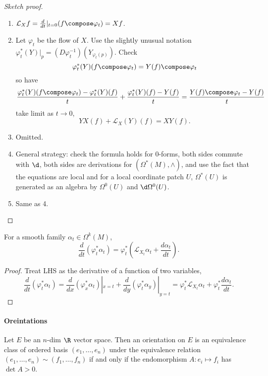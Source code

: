 \documentclass[a4paper]{article}
\newcommand{\w}{\wedge} %
\begin{document}
\begin{proof}[Sketch proof]\leavevmode
  \begin{enumerate}
  \item \(\mathcal L_X f = \frac{d}{dt}|_{t = 0} (f \compose \varphi_t) = Xf\).
  \item Let \(\varphi_t\) be the flow of \(X\). Use the slightly unusual notation \(\varphi_t^*(Y)|_p = (D\varphi_t^{-1})(Y_{\varphi_t(p)})\). Check
    \[
      \varphi_t^*(Y)(f \compose \varphi_t) = Y(f) \compose \varphi_t
    \]
    so have
    \[
      \frac{\varphi_t^*(Y)(f \compose \varphi_t) - \varphi_t^*(Y)(f)}{t} + \frac{\varphi_t^*(Y)(f) - Y(f)}{t} = \frac{Y(f) \compose \varphi_t - Y(f)}{t}
    \]
    take limit as \(t \to 0\),
    \[
      YX(f) + \mathcal L_X(Y)(f) = XY(f).
    \]
  \item Omitted.
  \item General strategy: check the formula holds for \(0\)-forms, both sides commute with \(\d\), both sides are derivations for \((\Omega^*(M), \w)\), and use the fact that the equations are local and for a local coordinate patch \(U\), \(\Omega^*(U)\) is generated as an algebra by \(\Omega^0(U)\) and \(\d \Omega^0(U)\).
  \item Same as 4.
  \end{enumerate}
\end{proof}

\begin{lemma}
  For a smooth family \(\alpha_t \in \Omega^k(M)\),
  \[
    \frac{d}{dt}(\varphi_t^* \alpha_t) = \varphi_t^*(\mathcal L_{X_t} \alpha_t + \frac{d \alpha_t}{dt}).
  \]
\end{lemma}

\begin{proof}
  Treat LHS as the derivative of a function of two variables,
  \[
    \frac{d}{dt}(\varphi_t^* \alpha_t)
    = \frac{d}{dx}(\varphi_x^* \alpha_t)|_{x = t} + \frac{d}{dy}(\varphi_t^* \alpha_y)|_{y = t}
    = \varphi_t^*\mathcal L_{X_t}\alpha_t + \varphi_t^* \frac{d\alpha_t}{dt}.
  \]
\end{proof}

\paragraph{Oreintations}

Let \(E\) be an \(n\)-dim \(\R\) vector space. Then an orientation on \(E\) is an equivalence class of ordered basis \((e_1, \dots, e_n)\) under the equivalence relation \((e_1, \dots, e_n) \sim (f_1, \dots, f_n)\) if and only if the endomorphism \(A: e_i \mapsto f_i\) has \(\det A > 0\).
\end{document}
